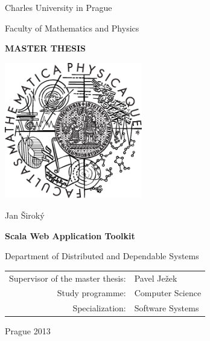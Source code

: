 \documentclass[12pt,a4paper]{report}
\begin{document}



\pagestyle{empty}

\begin{center}
\large Charles University in Prague
\medskip

Faculty of Mathematics and Physics

\vfill

{\bf\Large MASTER THESIS}

\vfill

\centerline{\mbox{\includegraphics[width=60mm]{img/logo.eps}}}

\vfill

\vspace{5mm}

{\LARGE Jan Široký}

\vspace{15mm}

{\LARGE\bfseries Scala Web Application Toolkit}

\vfill

Department of Distributed and Dependable Systems

\vfill

\begin{tabular}{rl}
Supervisor of the master thesis: & Pavel Ježek \\
\noalign{\vspace{2mm}}
Study programme: & Computer Science \\
\noalign{\vspace{2mm}}
Specialization: & Software Systems \\
\end{tabular}

\vfill

Prague 2013
\end{center}
\end{document}
